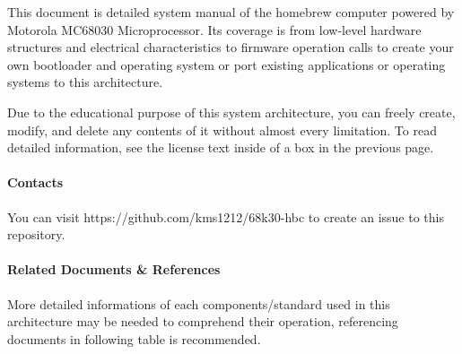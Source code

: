 \documentclass[11pt]{report}
\begin{document}
\begin{flushleft}
This document is detailed system manual of the homebrew computer powered by
Motorola MC68030 Microprocessor. Its coverage is from low-level hardware
structures and electrical characteristics to firmware operation calls to create
your own bootloader and operating system or port existing applications or
operating systems to this architecture.

Due to the educational purpose of this system architecture, you can freely
create, modify, and delete any contents of it without almost every limitation.
To read detailed information, see the license text inside of a box in the
previous page.
\end{flushleft}

\paragraph*{Contacts}

\begin{flushleft}
You can visit https://github.com/kms1212/68k30-hbc to create an issue to this
repository.
\end{flushleft}

\paragraph*{Related Documents \& References}

\begin{flushleft}
More detailed informations of each components/standard used in this architecture
may be needed to comprehend their operation, referencing documents in following
table is recommended.
\end{flushleft}
\end{document}
